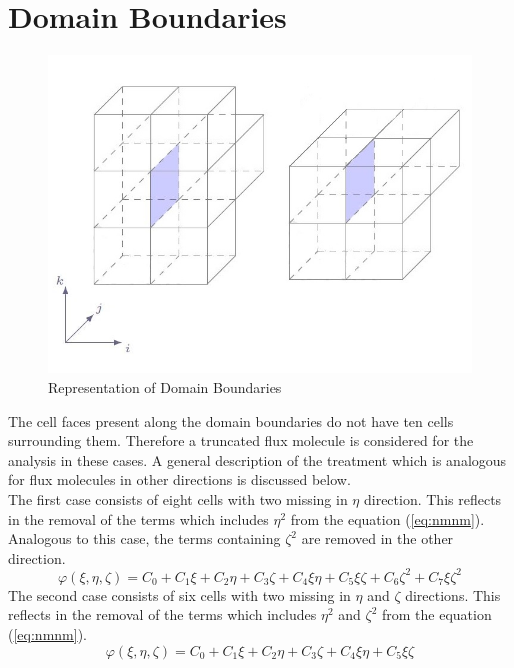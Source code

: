 \section*{Domain Boundaries}
\begin{figure}[H]
\centering
\includegraphics[scale=0.7]{include/backmatter/bd.JPG}
\caption{Representation of Domain Boundaries}
\label{fig:cellb}
\end{figure}
The cell faces present along the domain boundaries do not have ten cells surrounding them. Therefore a truncated flux molecule is considered for the analysis in these cases. A general description of the treatment which is analogous for flux molecules in other directions is discussed below.
\\The first case consists of eight cells with two missing in $\eta$ direction. This reflects in the removal of the terms which includes $\eta^2$ from the equation (\ref{eq:nmnm}). Analogous to this case, the terms containing $\zeta^2$ are removed in the other direction.
\begin{equation}
    {\varphi}(\xi,\eta,\zeta)=C_0+C_1\xi+C_2\eta+C_3\zeta+C_4\xi\eta+C_5\xi\zeta+C_6\zeta^2+C_7\xi\zeta^2
\end{equation}
The second case consists of six cells with two missing in $\eta$ and $\zeta$ directions. This reflects in the removal of the terms which includes $\eta^2$ and $\zeta^2$ from the equation (\ref{eq:nmnm}).
\begin{equation}
    {\varphi}(\xi,\eta,\zeta)=C_0+C_1\xi+C_2\eta+C_3\zeta+C_4\xi\eta+C_5\xi\zeta
\end{equation}



